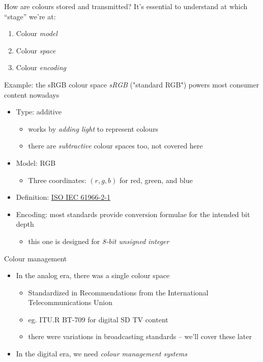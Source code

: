 \documentclass[aspectratio=169,handout,usepdftitle=false]{fireshonks}
\begin{document}
\begin{frame}{How are colours stored and transmitted?}
    It's essential to understand at which \enquote{stage} we're at:
    \begin{enumerate}
        \item Colour \emph{model}
        \item Colour \emph{space}
        \item Colour \emph{encoding}
    \end{enumerate}
\end{frame}
\begin{frame}{Example: the sRGB colour space}
    \emph{sRGB} ("standard RGB") powers most consumer content nowadays
    \begin{itemize}
        \item Type: additive
              \begin{itemize}
                  \item works by \emph{adding light} to represent colours
                  \item there are \emph{subtractive} colour spaces too, not covered here
              \end{itemize}
        \item Model: RGB
              \begin{itemize}
                  \item Three coordinates: $(r, g, b)$ for red, green, and blue
              \end{itemize}
        \item Definition: \href{https://www.evs.ee/en/evs-en-61966-2-1-2002}{ISO IEC 61966-2-1}
        \item Encoding: most standards provide conversion formulae for the intended bit depth
              \begin{itemize}
                  \item this one is designed for \emph{8-bit unsigned integer}
              \end{itemize}
    \end{itemize}
\end{frame}
\begin{frame}{Colour management}
    \begin{itemize}
        \item In the analog era, there was a single colour space
              \begin{itemize}
                  \item Standardized in Recommendations from the International Telecommunications Union
                  \item eg. ITU.R BT-709 \parencite{BT709} for digital SD TV content
                  \item there were variations in broadcasting standards -- we'll cover these later
              \end{itemize}
        \item In the digital era, we need \emph{colour management systems}
    \end{itemize}
\end{frame}
\end{document}
